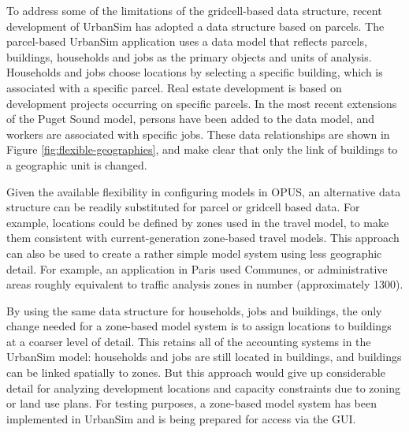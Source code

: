 To address some of the limitations of the gridcell-based data structure, recent development of UrbanSim has adopted a data structure based on parcels.
The parcel-based UrbanSim application uses a data model that reflects parcels, buildings, households and jobs as the
primary objects and units of analysis.  Households and jobs
choose locations by selecting a specific building, which is associated with a specific parcel.
Real estate development is based on development projects occurring on specific parcels.  In the most recent extensions of the Puget Sound model,
persons have been added to the data model, and workers are associated with specific jobs.  These data relationships
are shown in Figure \ref{fig:flexible-geographies}, and make clear that only the link of buildings to a geographic unit is changed.



Given the available flexibility in configuring models in OPUS, an alternative data structure can be readily substituted for parcel or gridcell based data.  For example, locations could be defined by zones used in the travel model, to make them consistent with current-generation zone-based travel models.  This approach can also be used to create a rather simple model system using less geographic detail.  For example, an application in Paris used Communes, or administrative areas roughly equivalent to traffic analysis zones in number (approximately 1300).

By using the same data structure for households, jobs and buildings, the only change needed for a zone-based model system is to assign locations to buildings at a coarser level of detail.  This retains all of the accounting systems in the UrbanSim model: households and jobs are still located in buildings, and buildings can be linked spatially to zones.  But this approach would give up considerable detail for analyzing development locations and capacity constraints due to zoning or land use plans. For testing purposes, a zone-based model system has been implemented in UrbanSim and is being prepared for access via the GUI.

